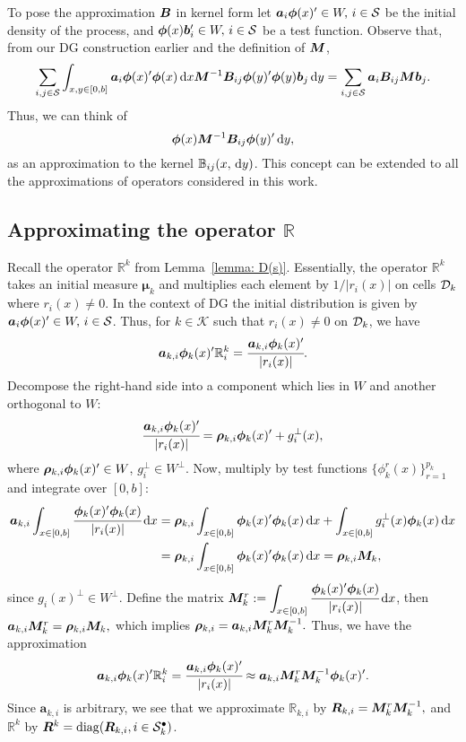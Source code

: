 To pose the approximation \(\boldsymbol B\) in kernel form let \(\boldsymbol a_i \boldsymbol \phi(x)'{}\in W,\,i\in\mathcal{S}\) be the initial density of the process, and \(\boldsymbol \phi(x)\boldsymbol b_i'{}\in W,\,i\in\mathcal{S}\) be a test function. Observe that, from our DG construction earlier and the definition of \({\boldsymbol M}\), 
\[\sum_{i,j\in\mathcal{S}}\int_{x,y\in[0,b]} \boldsymbol a_i \boldsymbol \phi(x)'{} \boldsymbol \phi (x) \, \mathrm{d} x {\boldsymbol M}^{-1}{  \boldsymbol B}_{ij} \boldsymbol \phi(y)'{} \boldsymbol \phi(y)\boldsymbol b_j \, \mathrm{d} y= \sum_{i,j\in\mathcal{S}} \boldsymbol a_i {  \boldsymbol B}_{ij} {\boldsymbol M} \boldsymbol b_j .\]
Thus, we can think of 
\[\boldsymbol \phi (x) {\boldsymbol M}^{-1}{  \boldsymbol B}_{ij} \boldsymbol \phi(y)'{}\, \mathrm{d} y,\]
as an approximation to the kernel \(\mathbb B_{ij}(x,\, \mathrm{d} y)\). This concept can be extended to all the approximations of operators considered in this work. 

\subsection{Approximating the operator \(\mathbb R\)}\label{sec: approx r}
Recall the operator \(\mathbb R^k\) from Lemma~\ref{lemma: D(s)}. Essentially, the operator \(\mathbb R^k\) takes an initial measure \(\boldsymbol \mu_k\) and multiplies each element by \(1/|r_i(x)|\) on cells \(\mathcal{D}_k\) where \(r_i(x)\neq 0\). In the context of DG the initial distribution is given by \(\boldsymbol a_i \boldsymbol \phi(x)'{}\in W,\,i\in\mathcal{S}\). Thus, for \(k\in\mathcal K\) such that \(r_i(x)\neq0\) on \(\mathcal{D}_k\), we have 
\[\boldsymbol a_{k,i} \boldsymbol \phi_k(x)'{}\mathbb R^k_i = \cfrac{\boldsymbol a_{k,i} \boldsymbol \phi_k(x)'{}}{|r_i(x)|}.\]
Decompose the right-hand side into a component which lies in \(W\) and another orthogonal to \(W\): 
\[\cfrac{\boldsymbol a_{k,i} \boldsymbol \phi_k(x)'{}}{|r_i(x)|} = \boldsymbol \rho_{k,i} \boldsymbol \phi_k(x)'{} + g_i^\perp(x),\] where \(\boldsymbol \rho_{k,i} \boldsymbol\phi_k(x)'{}\in W\), \(g_i^\perp \in W^\perp\). Now, multiply by test functions \(\{\phi^r_k(x)\}_{r=1}^{p_k}\) and integrate over \([0,b]\):
\begin{align*}
	\boldsymbol a_{k,i}\int_{x\in[0,b]} \cfrac{ \boldsymbol \phi_k(x)'{}\boldsymbol \phi_k(x)}{|r_i(x)|}\, \mathrm{d} x
	&=\boldsymbol \rho_{k,i} \int_{x\in[0,b]}\boldsymbol \phi_k(x)'{}\boldsymbol \phi_k(x)\, \mathrm{d} x + \int_{x\in[0,b]} g_i^\perp(x)\boldsymbol\phi_k(x)\, \mathrm{d} x 
	\\&= \boldsymbol \rho_{k,i} \int_{x\in[0,b]}\boldsymbol \phi_k(x)'{}\boldsymbol \phi_k(x)\, \mathrm{d} x = \boldsymbol \rho_{k,i}\boldsymbol M_k,
\end{align*}
since \(g_i(x)^\perp\in W^\perp\). Define the matrix \(\boldsymbol M_k^r := \displaystyle\int_{x\in[0,b]} \cfrac{ \boldsymbol \phi_k(x)'{}\boldsymbol \phi_k(x)}{|r_i(x)|}\, \mathrm{d} x\), then 
\(
	\boldsymbol a_{k,i}\boldsymbol M_k^r
	= \boldsymbol \rho_{k,i} \boldsymbol M_k,
\)
which implies
\(
	\boldsymbol \rho_{k,i}  = \boldsymbol a_{k,i}\boldsymbol M_k^r\boldsymbol M_k^{-1}.
\)
Thus, we have the approximation 
\[\boldsymbol a_{k,i} \boldsymbol \phi_k(x)'{}\mathbb R^k_i = \cfrac{\boldsymbol a_{k,i} \boldsymbol \phi_k(x)'{}}{|r_i(x)|}\approx \boldsymbol a_{k,i}\boldsymbol M_k^r\boldsymbol M_k^{-1}\boldsymbol\phi_k(x)'{}.\]
Since \(\boldsymbol a_{k,i}\) is arbitrary, we see that we approximate \(\mathbb R_{k,i}\) by \(  \boldsymbol R_{k,i} = \boldsymbol M_k^r\boldsymbol M_k^{-1},\)
and \(\mathbb R^k\) by \(  \boldsymbol R^k = \mathrm{diag}(  \boldsymbol R_{k,i},{i\in\mathcal{S}^\bullet_k})\).

